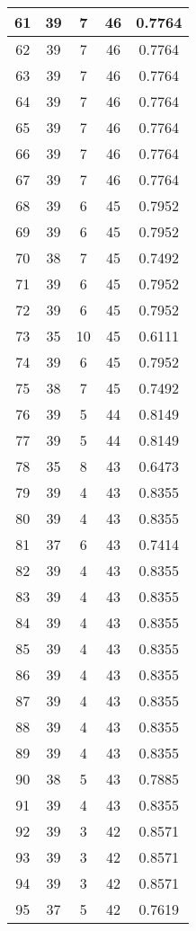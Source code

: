 \documentclass[letterpaper, 12pt]{article}
\begin{document}
\begin{longtable}{|c|c|c|c|c|}
\hline
61 & 39 & 7 & 46 & 0.7764 \\
\hline
62 & 39 & 7 & 46 & 0.7764 \\
\hline
63 & 39 & 7 & 46 & 0.7764 \\
\hline
64 & 39 & 7 & 46 & 0.7764 \\
\hline
65 & 39 & 7 & 46 & 0.7764 \\
\hline
66 & 39 & 7 & 46 & 0.7764 \\
\hline
67 & 39 & 7 & 46 & 0.7764 \\
\hline
68 & 39 & 6 & 45 & 0.7952 \\
\hline
69 & 39 & 6 & 45 & 0.7952 \\
\hline
70 & 38 & 7 & 45 & 0.7492 \\
\hline
71 & 39 & 6 & 45 & 0.7952 \\
\hline
72 & 39 & 6 & 45 & 0.7952 \\
\hline
73 & 35 & 10 & 45 & 0.6111 \\
\hline
74 & 39 & 6 & 45 & 0.7952 \\
\hline
75 & 38 & 7 & 45 & 0.7492 \\
\hline
76 & 39 & 5 & 44 & 0.8149 \\
\hline
77 & 39 & 5 & 44 & 0.8149 \\
\hline
78 & 35 & 8 & 43 & 0.6473 \\
\hline
79 & 39 & 4 & 43 & 0.8355 \\
\hline
80 & 39 & 4 & 43 & 0.8355 \\
\hline
81 & 37 & 6 & 43 & 0.7414 \\
\hline
82 & 39 & 4 & 43 & 0.8355 \\
\hline
83 & 39 & 4 & 43 & 0.8355 \\
\hline
84 & 39 & 4 & 43 & 0.8355 \\
\hline
85 & 39 & 4 & 43 & 0.8355 \\
\hline
86 & 39 & 4 & 43 & 0.8355 \\
\hline
87 & 39 & 4 & 43 & 0.8355 \\
\hline
88 & 39 & 4 & 43 & 0.8355 \\
\hline
89 & 39 & 4 & 43 & 0.8355 \\
\hline
90 & 38 & 5 & 43 & 0.7885 \\
\hline
91 & 39 & 4 & 43 & 0.8355 \\
\hline
92 & 39 & 3 & 42 & 0.8571 \\
\hline
93 & 39 & 3 & 42 & 0.8571 \\
\hline
94 & 39 & 3 & 42 & 0.8571 \\
\hline
95 & 37 & 5 & 42 & 0.7619 \\

\end{longtable}
\end{document}
